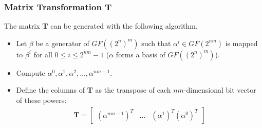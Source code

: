 \documentclass[handout]{beamer}
\begin{document}
\begin{frame}
	\frametitle{Matrix Transformation \textbf{T}}
	The matrix \textbf{T} can be generated with the following algorithm.
	\begin{itemize}
		\item Let $\beta$ be a generator of $GF((2^n)^m)$ such that $\alpha^i \in GF(2^{nm})$ is mapped to $\beta^i$ for all $0 \leq i \leq 2^{nm} - 1$ ($\alpha$ forms a basis of $GF((2^n)^m)$).
		\item Compute $\alpha^0, \alpha^1, \alpha^2,\dots,\alpha^{nm - 1}$.
		\item Define the columns of \textbf{T} as the transpose of each $nm$-dimensional bit vector of these powers:
\begin{align*}
		\textbf{T} =  \left[ \begin{array}{cccc}
(\alpha^{nm - 1})^T & \dots & (\alpha^{1})^T (\alpha^{0})^T \end{array} \right]
\end{align*}
	\end{itemize}
\end{frame}
\end{document}
